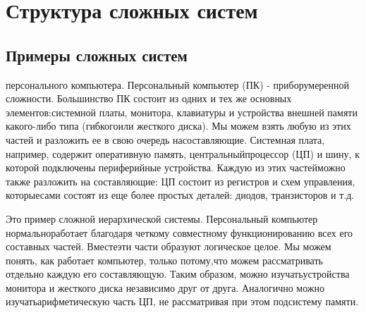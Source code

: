 \documentclass[10pt]{article}
\begin{document}
\section{Структура сложных систем}
\subsection{Примеры сложных систем} 
{ персонального компьютера.} Персональный компьютер (ПК) - прибор\linebreak умеренной сложности. Большинство ПК состоит из одних и тех же основных элементов:\linebreak системной платы, монитора, клавиатуры и устройства внешней памяти какого-либо типа (гибкого\linebreak или жесткого диска). Мы можем взять любую из этих частей и разложить ее в свою очередь на\linebreak составляющие. Системная плата, например, содержит оперативную память, центральный\linebreak процессор (ЦП) и шину, к которой подключены периферийные устройства. Каждую из этих частей\linebreak можно также разложить на составляющие: ЦП состоит из регистров и схем управления, которые\linebreak сами состоят из еще более простых деталей: диодов, транзисторов и т.д. \vspace{3mm}

Это пример сложной иерархической системы. Персональный компьютер нормально\linebreak работает благодаря четкому совместному функционированию всех его составных частей. Вместе\linebreak эти части образуют логическое целое. Мы можем понять, как работает компьютер, только потому,\linebreak что можем рассматривать отдельно каждую его составляющую. Таким образом, можно изучать\linebreak устройства монитора и жесткого диска независимо друг от друга. Аналогично можно изучать\linebreak арифметическую часть ЦП, не рассматривая при этом подсистему памяти. \vspace{3mm}
\end{document}
